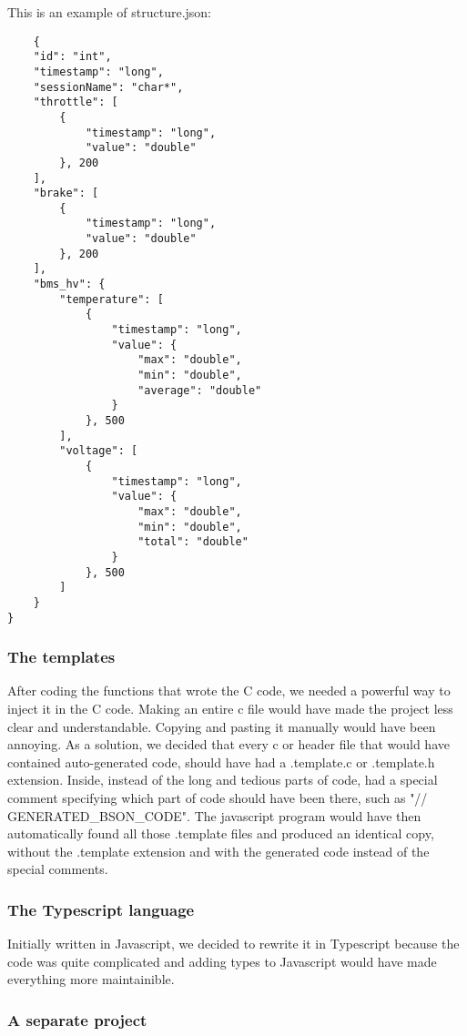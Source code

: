 This is an example of structure.json:
\begin{verbatim}
    {
    "id": "int",
    "timestamp": "long",
    "sessionName": "char*",
    "throttle": [
        {
            "timestamp": "long",
            "value": "double"
        }, 200
    ],
    "brake": [
        {
            "timestamp": "long",
            "value": "double"
        }, 200
    ],
    "bms_hv": {
        "temperature": [
            {
                "timestamp": "long",
                "value": {
                    "max": "double",
                    "min": "double",
                    "average": "double"
                }
            }, 500
        ],
        "voltage": [
            {
                "timestamp": "long",
                "value": {
                    "max": "double",
                    "min": "double",
                    "total": "double"
                }
            }, 500
        ]
    }
}
\end{verbatim}

\subsubsection{The templates}

After coding the functions that wrote the C code, we needed a powerful way to inject it in the C code. Making an entire c file would have made 
the project less clear and understandable. Copying and pasting it manually would have been annoying. As a solution, we decided that every c 
or header file that would have contained auto-generated code, should have had a .template.c or .template.h extension. Inside, instead of the
long and tedious parts of code, had a special comment specifying which part of code should have been there, such as "// {{GENERATED\_BSON\_CODE}}".
The javascript program would have then automatically found all those .template files and produced an identical copy, without the .template extension
and with the generated code instead of the special comments.

\subsubsection{The Typescript language}

Initially written in Javascript, we decided to rewrite it in Typescript because the code was quite complicated and adding types to Javascript
would have made everything more maintainible.

\subsubsection{A separate project}

